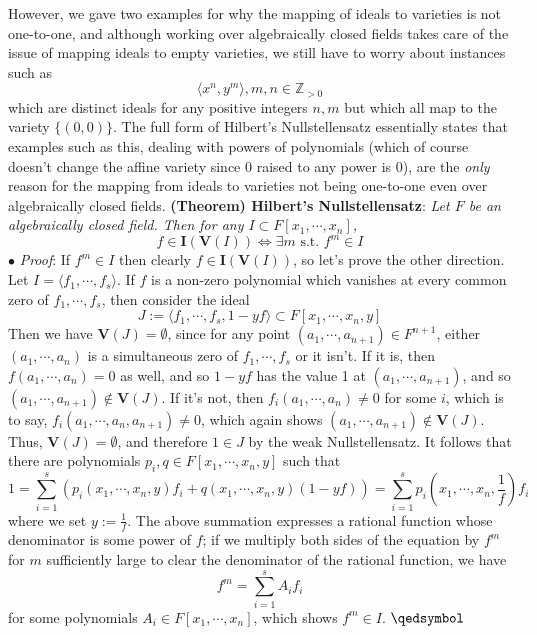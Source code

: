 \documentclass{article}
\newcommand*{\tb}{\textbf}
\newcommand*{\ti}{\textit}
\newcommand*{\n}{\newline}
\newcommand*{\nn}{\newline \newline}
\newcommand*{\Fx}{\ensuremath{F[x_1, \cdots, x_n]}}
\newcommand*{\fs}{f_1, \cdots, f_s}
\newcommand*{\lfsr}{\langle f_1, \cdots, f_s \rangle}
\newcommand*{\V}{\ensuremath{\mathbf{V}}}
\newcommand*{\I}{\ensuremath{\mathbf{I}}}
\begin{document}
\n
However, we gave two examples for why the mapping of ideals to varieties is not one-to-one, and although working over algebraically closed fields takes care of the issue of mapping ideals to empty varieties, we still have to worry about instances such as
$$ \langle x^n, y^m \rangle, m, n \in \mathbb{Z}_{> 0} $$
which are distinct ideals for any positive integers $ n, m $ but which all map to the variety $ \{ (0, 0) \} $. The full form of Hilbert's Nullstellensatz essentially states that examples such as this, dealing with powers of polynomials (which of course doesn't change the affine variety since 0 raised to any power is 0), are the \ti{only} reason for the mapping from ideals to varieties not being one-to-one even over algebraically closed fields.
\nn
\tb{(Theorem) Hilbert's Nullstellensatz}: \ti{Let $ F $ be an algebraically closed field. Then for any $ I \subset \Fx $,}
$$ f \in \I(\V(I)) \iff \exists m \text{ s.t. } f^m \in I $$
\indent $ \bullet $ \ti{Proof}: If $ f^m \in I $ then clearly $ f \in \I(\V(I)) $, so let's prove the other direction. Let $ I = \lfsr $. If $ f $ is a non-zero polynomial which vanishes at every common zero of $ \fs $, then consider the ideal
$$ J := \langle \fs, 1 - y f \rangle \subset F[x_1, \cdots, x_n, y] $$
Then we have $ \V(J) = \emptyset $, since for any point $ (a_1, \cdots, a_{n + 1}) \in F^{n + 1} $, either $ (a_1, \cdots, a_n) $ is a simultaneous zero of $ \fs $ or it isn't. If it is, then $ f(a_1, \cdots, a_n) = 0 $ as well, and so $ 1 - y f $ has the value 1 at $ (a_1, \cdots, a_{n + 1}) $, and so $ (a_1, \cdots, a_{n + 1}) \notin \V(J) $. If it's not, then $ f_i(a_1, \cdots, a_n) \neq 0 $ for some $ i $, which is to say, $ f_i(a_1, \cdots, a_n, a_{n + 1}) \neq 0 $, which again shows $ (a_1, \cdots, a_{n + 1}) \notin \V(J) $. Thus, $ \V(J) = \emptyset $, and therefore $ 1 \in J $ by the weak Nullstellensatz.
\n
\indent It follows that there are polynomials $ p_i, q \in F[x_1, \cdots, x_n, y] $ such that
$$ 1 = \sum_{i = 1}^s (p_i(x_1, \cdots, x_n, y) f_i + q(x_1, \cdots, x_n, y) (1 - y f)) = \sum_{i = 1}^s p_i(x_1, \cdots, x_n, \frac{1}{f}) f_i $$
where we set $ y := \frac{1}{f} $. The above summation expresses a rational function whose denominator is some power of $ f $; if we multiply both sides of the equation by $ f^m $ for $ m $ sufficiently large to clear the denominator of the rational function, we have
$$ f^m = \sum_{i = 1}^s A_i f_i $$
for some polynomials $ A_i \in \Fx $, which shows $ f^m \in I $. $ \qedsymbol $
\n
\end{document}
